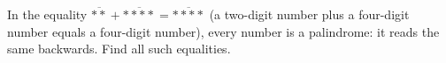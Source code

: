 In the equality $\overline{**}+\overline{****}=\overline{****}$ (a two-digit number plus a four-digit number equals a four-digit number), every number is a palindrome: it reads the same backwards. Find all such equalities.
